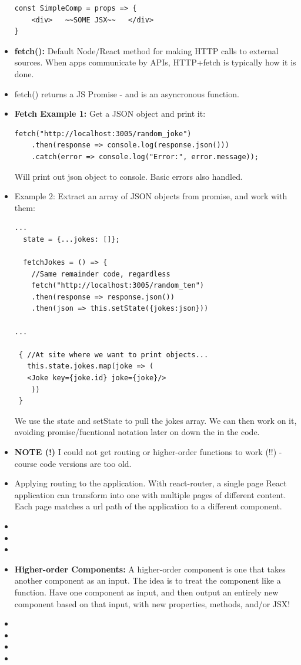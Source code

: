 \documentclass[8pt,a4paper]{extarticle}
\begin{document}
\begin{itemize}
\begin{verbatim}
const SimpleComp = props => {
	<div>   ~~SOME JSX~~   </div>
}
\end{verbatim}


\item \textbf{fetch():} Default Node/React method for making HTTP calls to external sources. When apps communicate by APIs, HTTP+fetch is typically how it is done.
\item fetch() returns a JS Promise - and is an asyncronous function.
\item \textbf{Fetch Example 1:} Get a JSON object and print it:
\begin{verbatim}
fetch("http://localhost:3005/random_joke")
    .then(response => console.log(response.json()))
    .catch(error => console.log("Error:", error.message));
\end{verbatim}

Will print out json object to console. Basic errors also handled.

\item Example 2: Extract an array of JSON objects from promise, and work with them:

\begin{verbatim}
...
  state = {...jokes: []};

  fetchJokes = () => {
    //Same remainder code, regardless
    fetch("http://localhost:3005/random_ten")
    .then(response => response.json())
    .then(json => this.setState({jokes:json}))

...

 { //At site where we want to print objects...
   this.state.jokes.map(joke => (
   <Joke key={joke.id} joke={joke}/>
    ))
 }
\end{verbatim}

We use the state and setState to pull the jokes array. We can then work on it, avoiding promise/fucntional notation later on down the in the code.

\item \textbf{NOTE (!)} I could not get routing or higher-order functions to work (!!) - course code versions are too old.
\item Applying routing to the application. With react-router, a single page React application can transform into one with multiple pages of different content. Each page matches a url path of the application to a different component.
\item
\item
\item
\item \textbf{Higher-order Components:} A higher-order component is one that takes another component as an input. The idea is to treat the component like a function. Have one component as input, and then output an entirely new component based on that input, with new properties, methods, and/or JSX!
\item
\item
\item
\item
\end{itemize}
\end{document}

